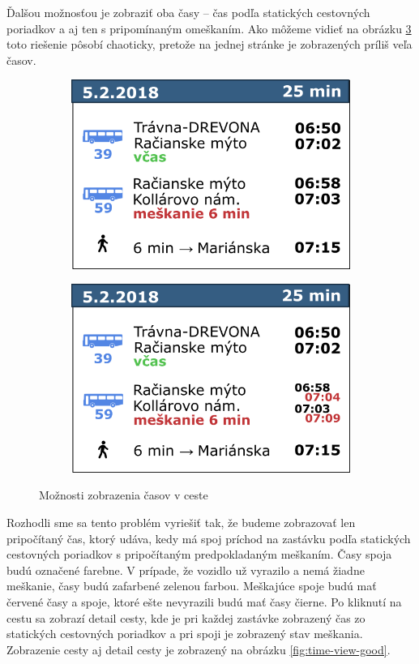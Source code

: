 Ďalšou možnosťou je zobraziť oba časy – čas podľa statických cestovných poriadkov a aj ten s pripomínaným omeškaním. Ako môžeme vidieť na obrázku \ref{fig:time-view-bad2} toto riešenie pôsobí chaoticky, pretože na jednej stránke je zobrazených príliš veľa časov. 

\begin{figure}[H]
\centering
	\begin{subfigure}[b]{0.48\textwidth}
		\centering
 		\includegraphics[width=0.7\linewidth]{images/time-view1}
		\caption{ }
		\label{fig:time-view-bad1}
	\end{subfigure}
	\begin{subfigure}[b]{0.48\textwidth}
		\centering
		\includegraphics[width=0.7\linewidth]{images/time-view2}
			\caption{ }
		\label{fig:time-view-bad2}
	\end{subfigure}
	\caption[Možnosti zobrazenia časov v ceste]{Možnosti zobrazenia časov v ceste}
\end{figure}

Rozhodli sme sa tento problém vyriešiť tak, že budeme zobrazovať len pripočítaný čas, ktorý udáva, kedy má spoj príchod na zastávku podľa statických cestovných poriadkov s pripočítaným predpokladaným meškaním. Časy spoja budú označené farebne. V prípade, že vozidlo už vyrazilo a nemá žiadne meškanie, časy budú zafarbené zelenou farbou. Meškajúce spoje budú mať červené časy a spoje, ktoré ešte nevyrazili budú mať časy čierne. 
Po kliknutí na cestu sa zobrazí detail cesty, kde je pri každej zastávke zobrazený čas zo statických cestovných  poriadkov a pri spoji je zobrazený stav meškania. Zobrazenie cesty aj detail cesty je zobrazený na obrázku \ref{fig:time-view-good}.


